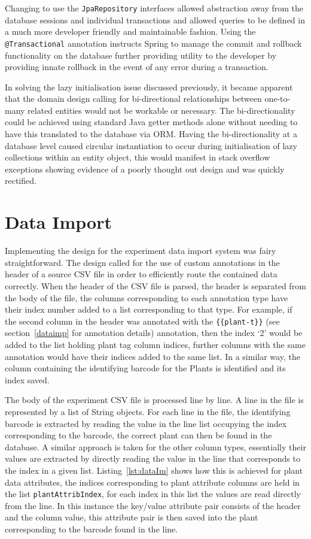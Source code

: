 Changing to use the \texttt{JpaRepository} interfaces allowed abstraction away from the database sessions and individual transactions and allowed queries to be defined in a much more developer friendly and maintainable fashion. Using the \texttt{@Transactional} annotation instructs Spring to manage the commit and rollback functionality on the database further providing utility to the developer by providing innate rollback in the event of any error during a transaction. 

In solving the lazy initialisation issue discussed previously, it became apparent that the domain design calling for bi-directional relationships between one-to-many related entities would not be workable or necessary. The bi-directionality could be achieved using standard Java getter methods alone without needing to have this translated to the database via ORM. Having the bi-directionality at a database level caused circular instantiation to occur during initialisation of lazy collections within an entity object, this would manifest in stack overflow exceptions showing evidence of a poorly thought out design and was quickly rectified.

\section{Data Import}
Implementing the design for the experiment data import system was fairy straightforward. The design called for the use of custom annotations in the header of a source CSV file in order to efficiently route the contained data correctly. When the header of the CSV file is parsed, the header is separated from the body of the file, the columns corresponding to each annotation type have their index number added to a list corresponding to that type. For example, if the second column in the header was annotated with the \texttt{\{\{plant-t\}\}} (see section~\ref{dataimp} for annotation details) annotation, then the index `2' would be added to the list holding plant tag column indices, further columns with the same annotation would have their indices added to the same list. In a similar way, the column containing the identifying barcode for the Plants is identified and its index saved. 

The body of the experiment CSV file is processed line by line. A line in the file is represented by a list of String objects. For each line in the file, the identifying barcode is extracted by reading the value in the line list occupying the index corresponding to the barcode, the correct plant can then be found in the database. A similar approach is taken for the other column types, essentially their values are extracted by directly reading the value in the line that corresponds to the index in a given list. Listing~\ref{lst:dataIm} shows how this is achieved for plant data attributes, the indices corresponding to plant attribute columns are held in the list \texttt{plantAttribIndex}, for each index in this list the values are read directly from the line. In this instance the key/value attribute pair consists of the header and the column value, this attribute pair is then saved into the plant corresponding to the barcode found in the line.

